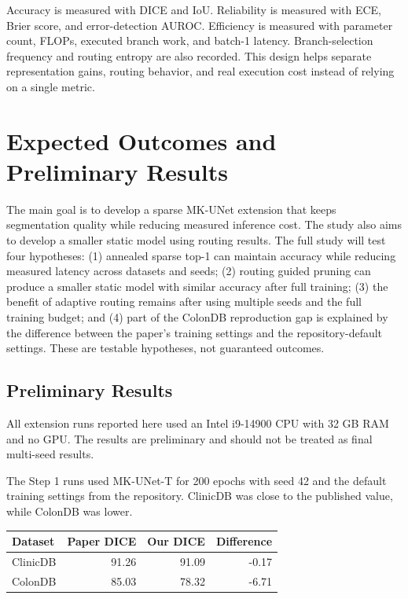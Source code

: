 \documentclass[10pt,a4paper]{article}
\begin{document}
Accuracy is measured with DICE and IoU. Reliability is measured with ECE, Brier score, and error-detection AUROC. Efficiency is measured with parameter count, FLOPs, executed branch work, and batch-1 latency. Branch-selection frequency and routing entropy are also recorded. This design helps separate representation gains, routing behavior, and real execution cost instead of relying on a single metric.

\section{Expected Outcomes and Preliminary Results}

The main goal is to develop a sparse MK-UNet extension that keeps segmentation quality while reducing measured inference cost. The study also aims to develop a smaller static model using routing results. The full study will test four hypotheses: (1) annealed sparse top-1 can maintain accuracy while reducing measured latency across datasets and seeds; (2) routing guided pruning can produce a smaller static model with similar accuracy after full training; (3) the benefit of adaptive routing remains after using multiple seeds and the full training budget; and (4) part of the ColonDB reproduction gap is explained by the difference between the paper's training settings and the repository-default settings. These are testable hypotheses, not guaranteed outcomes.

\subsection{Preliminary Results}

All extension runs reported here used an Intel i9-14900 CPU with 32 GB RAM and no GPU. The results are preliminary and should not be treated as final multi-seed results.

The Step 1 runs used MK-UNet-T for 200 epochs with seed 42 and the default training settings from the repository. ClinicDB was close to the published value, while ColonDB was lower.

\begin{center}\small
\begin{tabular}{@{}lrrr@{}}
\toprule
Dataset & Paper DICE & Our DICE & Difference \\
\midrule
ClinicDB & 91.26 & 91.09 & -0.17 \\
ColonDB & 85.03 & 78.32 & -6.71 \\
\bottomrule
\end{tabular}
\end{center}
\end{document}
